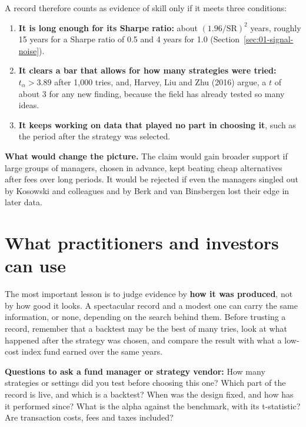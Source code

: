 A record therefore counts as evidence of skill only if it meets three conditions:

\begin{enumerate}
  \item \textbf{It is long enough for its Sharpe ratio:} about $(1.96/\mathrm{SR})^2$ years, roughly 15 years for a Sharpe ratio of 0.5 and 4 years for 1.0 (Section~\ref{sec:01-signal-noise}).
  \item \textbf{It clears a bar that allows for how many strategies were tried:} $t_\alpha > 3.89$ after 1,000 tries, and, Harvey, Liu and Zhu (2016) argue, a $t$ of about 3 for any new finding, because the field has already tested so many ideas.
  \item \textbf{It keeps working on data that played no part in choosing it}, such as the period after the strategy was selected.
\end{enumerate}

\textbf{What would change the picture.} The claim would gain broader support if large groups of managers, chosen in advance, kept beating cheap alternatives after fees over long periods. It would be rejected if even the managers singled out by Kosowski and colleagues and by Berk and van Binsbergen lost their edge in later data.

\section{What practitioners and investors can use}
\label{sec:01-investors}

The most important lesson is to judge evidence by \textbf{how it was produced}, not by how good it looks. A spectacular record and a modest one can carry the same information, or none, depending on the search behind them. Before trusting a record, remember that a backtest may be the best of many tries, look at what happened after the strategy was chosen, and compare the result with what a low-cost index fund earned over the same years.

\textbf{Questions to ask a fund manager or strategy vendor:} How many strategies or settings did you test before choosing this one? Which part of the record is live, and which is a backtest? When was the design fixed, and how has it performed since? What is the alpha against the benchmark, with its t-statistic? Are transaction costs, fees and taxes included?

